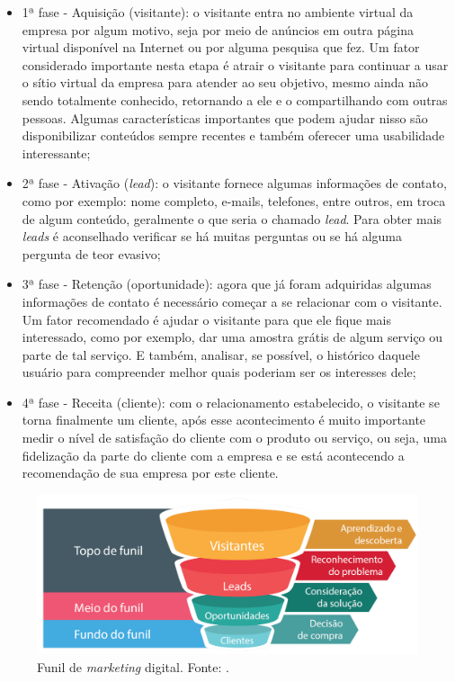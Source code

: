 \begin{itemize}
    \item 1ª fase - Aquisição (visitante): o visitante entra no ambiente virtual da empresa por algum motivo, seja por meio de anúncios em outra página virtual disponível na Internet ou por alguma pesquisa que fez. Um fator considerado importante nesta etapa é atrair o visitante para continuar a usar o sítio virtual da empresa para atender ao seu objetivo, mesmo ainda não sendo totalmente conhecido, retornando a ele e o compartilhando com outras pessoas. Algumas características importantes que podem ajudar nisso são disponibilizar conteúdos sempre recentes e também oferecer uma usabilidade interessante;
    
    \item 2ª fase - Ativação (\textit{lead}): o visitante fornece algumas informações de contato, como por exemplo: nome completo, e-mails, telefones, entre outros, em troca de algum conteúdo, geralmente o que seria o chamado \textit{lead}. Para obter mais \textit{leads} é aconselhado verificar se há muitas perguntas ou se há alguma pergunta de teor evasivo;
    
    \item 3ª fase - Retenção (oportunidade): agora que já foram adquiridas algumas informações de contato é necessário começar a se relacionar com o visitante. Um fator recomendado é ajudar o visitante para que ele fique mais interessado, como por exemplo, dar uma amostra grátis de algum serviço ou parte de tal serviço. E também, analisar, se possível, o histórico daquele usuário para compreender melhor quais poderiam ser os interesses dele;
    
    \item 4ª fase - Receita (cliente): com o relacionamento estabelecido, o visitante se torna finalmente um cliente, após esse acontecimento é muito importante medir o nível de satisfação do cliente com o produto ou serviço, ou seja, uma fidelização da parte do cliente com a empresa e se está acontecendo a recomendação de sua empresa por este cliente.

\end{itemize}

\begin{figure}[H]
    \centering
    \includegraphics[scale=0.2]{figuras/referencial_teorico/funil_marketing.png}
    \caption[Funil de \textit{marketing} digital]{Funil de \textit{marketing} digital. Fonte: \cite{INSIDEOUT:2018}.}
    \label{fig:funil_marketing}
\end{figure}

